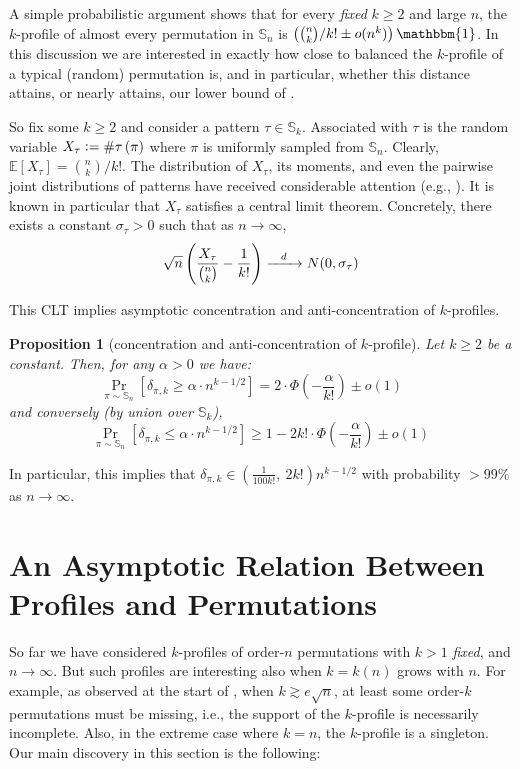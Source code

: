 \documentclass{article}
\newtheorem{proposition}[theorem]{Proposition}
\newcommand{\Sn}{\mathbb{S}_n}
\newcommand{\E}{\mathbb{E}}
\newcommand{\pc}[2]{{\# \mathtt{ #1 } \left( #2 \right)}}
\newcommand{\eqdef}{\vcentcolon=}
\theoremstyle{remark}
\theoremstyle{plain}
\begin{document}
A simple probabilistic argument shows that for every \emph{fixed} $k \ge 2$ and large $n$, the $k$-profile of almost every permutation in $\Sn$ is $\left(\binom{n}{k}/k! \pm o(n^k)\right) \mathbbm{1}$. In this discussion we are interested in exactly how close to balanced the $k$-profile of a typical (random) permutation is, and in particular, whether this distance attains, or nearly attains, our lower bound of .

So fix some $k \ge 2$ and consider a pattern $\tau \in \mathbb{S}_k$. Associated with $\tau$ is the random variable $X_\tau \eqdef \pc{\tau}{\pi}$ where $\pi$ is uniformly sampled from $\Sn$. Clearly, $\E[X_\tau] = \binom{n}{k}/{k!}$. The distribution of $X_\tau$, its moments, and even the pairwise joint distributions of patterns have received considerable attention (e.g., \cite{even2020patterns, janson2013asymptotic, hofer2018central, bona2007copies}). It is known in particular that  $X_\tau$ satisfies a central limit theorem. Concretely, there exists a constant $\sigma_\tau > 0$ such that as $n \to \infty$,
\[
    \sqrt{n} \left(\frac{ X_\tau }{\binom{n}{k}} - \frac{1}{k!} \right) \xrightarrow[\hphantom{space} ]{d} N(0, \sigma_\tau)
\]

This CLT implies asymptotic concentration and anti-concentration of $k$-profiles.

\begin{proposition}[concentration and anti-concentration of $k$-profile]
    Let $k \ge 2$ be a constant. Then, for any $\alpha > 0$ we have:
    \[
        \Pr_{\pi \sim \Sn} \left[ \delta_{\pi, k} \ge \alpha \cdot n^{k-1/2} \right] = 2 \cdot \Phi\left(-\frac{\alpha}{k!}\right) \pm o(1)\ \ \ \ \ \ 
    \]
    and conversely (by union over $\mathbb{S}_k$),
    \[
        \Pr_{\pi \sim \Sn} \left[ \delta_{\pi, k} \le \alpha \cdot n^{k-1/2} \right] \ge 1 - 2 k! \cdot \Phi\left(-\frac{\alpha}{k!}\right) \pm o(1)
    \]
\end{proposition}

In particular, this implies that $\delta_{\pi, k} \in \left(\frac{1}{100 k!},\ 2 k!\right)n^{k-1/2}$ with probability $> 99\%$ as $n \to \infty$.
 \section{An Asymptotic Relation Between Profiles and Permutations}
\label{section:profiles_to_perms}
So far we have considered $k$-profiles of order-$n$ permutations with $k > 1$ \textit{fixed}, and $n \to \infty$.
But such profiles are interesting also when $k=k(n)$ grows with $n$.
For example, as observed at the start of , when $k \gtrsim e \sqrt{n}$,
at least some order-$k$ permutations must be missing, i.e., the support of the $k$-profile is necessarily incomplete.
Also, in the extreme case where $k=n$, the $k$-profile is a singleton. Our main discovery in this section 
is the following:
\end{document}
